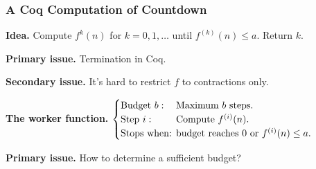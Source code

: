 \begin{frame}[fragile]
\frametitle{A Coq Computation of Countdown}
\textbf{Idea.} %
Compute $f^{k}(n)$ for $k=0, 1,\ldots$ until $f^{(k)}(n)\le a$. Return $k$.

\bigskip

\textbf{Primary issue.} Termination in Coq.

\bigskip

\textbf{Secondary issue.} It's hard to restrict $f$ to contractions only.

\bigskip

\textbf{The worker function.} $\begin{cases}
\text{Budget } b: & \hspace{-1em}\text{Maximum } b \text{ steps. } \\
\text{Step } i: & \hspace{-1em}\text{Compute } f^{(i)}(n). \\
\text{Stops when: } & \hspace{-1em}\text{budget reaches } 0 \text{ or } f^{(i)}(n) \le a.
\end{cases}$


\bigskip

\textbf{Primary issue.} How to determine a sufficient budget?
\end{frame}


